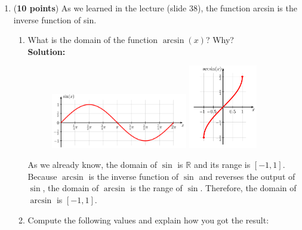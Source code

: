\documentclass[a4paper]{article}
\begin{document}
\begin{enumerate}

\item (\textbf{10 points}) As we learned in the lecture (slide 38), the function arcsin is the inverse function of sin.

\begin{enumerate}
	\item What is the domain of the function $\arcsin(x)$? Why?\\
	\textbf{Solution:}\\
	
\begin{figure}[ht]
  \includegraphics[width=0.6\textwidth]{sine.png}
  \includegraphics[width=0.3\textwidth]{arcsine.png}
\end{figure}	
	
	
As we already know, the domain of $\sin$ is $\mathbb{R}$ and its range is $[-1,1]$. Because $\arcsin$ is the inverse function of $\sin$ and reverses the output of $\sin$, the domain of $\arcsin$ is the range of $\sin$. Therefore, the domain of $\arcsin$ is $[-1,1]$.
	

\newpage

	
	
	\item Compute the following values and explain how you got the result:\\
	

\end{enumerate}
\end{enumerate}
\end{document}
